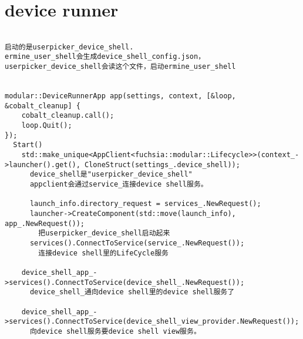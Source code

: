 \section{device runner}

\begin{verbatim}

启动的是userpicker_device_shell.
ermine_user_shell会生成device_shell_config.json，
userpicker_device_shell会读这个文件，启动ermine_user_shell


modular::DeviceRunnerApp app(settings, context, [&loop, &cobalt_cleanup] {
    cobalt_cleanup.call();
    loop.Quit();
});
  Start()
    std::make_unique<AppClient<fuchsia::modular::Lifecycle>>(context_->launcher().get(), CloneStruct(settings_.device_shell));
      device_shell是"userpicker_device_shell"
      appclient会通过service_连接device shell服务。

      launch_info.directory_request = services_.NewRequest();
      launcher->CreateComponent(std::move(launch_info), app_.NewRequest());
        把userpicker_device_shell启动起来
      services().ConnectToService(service_.NewRequest());
        连接device shell里的LifeCycle服务

    device_shell_app_->services().ConnectToService(device_shell_.NewRequest());
      device_shell_通向device shell里的device shell服务了

    device_shell_app_->services().ConnectToService(device_shell_view_provider.NewRequest());
      向device shell服务要device shell view服务。




\end{verbatim}